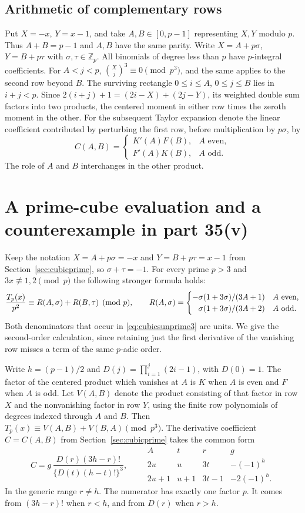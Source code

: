 \documentclass[11pt,a4paper]{article}
\begin{document}
\subsection*{Arithmetic of complementary rows}
Put $X=-x$, $Y=x-1$, and take $A,B\in[0,p-1]$ representing $X,Y$
modulo $p$. Thus $A+B=p-1$ and $A,B$ have the same parity. Write
$X=A+p\sigma$, $Y=B+p\tau$ with $\sigma,\tau\in\mathbb Z_p$.
All binomials of degree less than $p$ have $p$-integral coefficients.
For $A<j<p$, $\binom Xj^3\equiv0\pmod{p^3}$, and the same applies to the second row beyond $B$.
The surviving rectangle $0\leq i\leq A$, $0\leq j\leq B$ lies in $i+j<p$.
Since $2(i+j)+1=(2i-X)+(2j-Y)$, its weighted double sum factors into two products,
the centered moment in either row times the zeroth moment in the other.
For the subsequent Taylor expansion denote the linear coefficient contributed by perturbing the first row, before multiplication by $p\sigma$, by
\[
 C(A,B)=\begin{cases}K'(A)F(B),& A\text{ even},\\F'(A)K(B),& A\text{ odd}.\end{cases}
\]
The role of $A$ and $B$ interchanges in the other product.

\section{A prime-cube evaluation and a counterexample in part 35(v)}
\label{sec:cubic-p3}
Keep the notation $X=A+p\sigma=-x$ and $Y=B+p\tau=x-1$ from Section~\ref{sec:cubicprime}, so $\sigma+\tau=-1$. For every prime $p>3$ and $3x\not\equiv1,2\pmod p$ the following stronger formula holds:
\begin{equation}\label{eq:cubicsunprime3}
 \frac{T_p(x)}{p^2}\equiv R(A,\sigma)+R(B,\tau)\pmod p,\qquad
 R(A,\sigma)=
 \begin{cases}
 -\sigma(1+3\sigma)/(3A+1)& A\ {\rm even},\\
 \phantom{-}\sigma(1+3\sigma)/(3A+2)& A\ {\rm odd}.
 \end{cases}
\end{equation}
Both denominators that occur in \eqref{eq:cubicsunprime3} are units.
We give the second-order calculation, since retaining just the first derivative of the vanishing row misses a term of the same $p$-adic order.

Write $h=(p-1)/2$ and $D(j)=\prod_{i=1}^{j}(2i-1)$, with $D(0)=1$.
The factor of the centered product which vanishes at $A$ is $K$ when $A$ is even and $F$ when $A$ is odd. Let $V(A,B)$ denote the product consisting of that factor in row $X$ and the nonvanishing factor in row $Y$, using the finite row polynomials of degrees indexed through $A$ and $B$. Then $T_p(x)\equiv V(A,B)+V(B,A)\pmod{p^3}$. The derivative coefficient $C=C(A,B)$ from Section~\ref{sec:cubicprime} takes the common form
\[
 C=g\,\frac{D(r)(3h-r)!}{\{D(t)(h-t)!\}^3},
 \qquad
 \begin{array}{c|ccc}
 A&t&r&g\\ \hline
 2u&u&3t&-(-1)^h\\
 2u+1&u+1&3t-1&-2(-1)^h .
 \end{array}
\]
In the generic range $r\ne h$. The numerator has exactly one factor $p$. It comes from $(3h-r)!$ when $r<h$, and from $D(r)$ when $r>h$.
\end{document}

